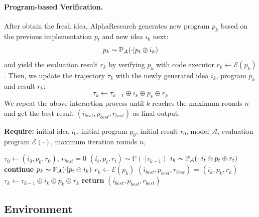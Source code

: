 \paragraph{Program-based Verification.}
After obtain the fresh idea, AlphaResearch generates new program $p_k$ based on the previous implementation $p_t$ and new idea $i_k$ next:
\begin{equation}
p_k\thicksim\mathbb{P}_{\mathcal{A}}(\cdot|p_t \oplus i_k)
\end{equation}
and yield the evaluation result $r_k$ by verifying $p_k$ with code executor $r_k\leftarrow\mathcal{E}(p_k)$. Then, we update the trajectory $\tau_k$ with the newly generated idea $i_k$, program $p_k$ and result $r_k$:
\begin{equation}
\tau_k\leftarrow\tau_{k-1}\oplus i_k\oplus p_k\oplus r_k
\end{equation}
We repeat the above interaction process until $k$ reaches the maximum rounds $n$ and get the best result $(i_{best}, p_{best}, r_{best})$ as final output.

\begin{algorithm}[t]
\small
\caption{AlphaResearch}
\label{alg:inference}
\textbf{Require:} initial idea $i_0$, initial program $p_0$, initial result $r_0$, model $\mathcal{A}$, evaluation program $\mathcal{E}(\cdot)$, maximum iteration rounds $n$, 
\begin{algorithmic}[1]
\State $\tau_0 \leftarrow (i_0, p_0, r_0)$, $r_{best}=0$ 
\State $(i_t, p_t, r_t) \sim \mathbb{P}(\cdot|\tau_{k-1})$ 
\State $i_k\thicksim\mathbb{P}_\mathcal{A}(\cdot|i_{t}\oplus p_{t}\oplus r_{t})$ 
\State \textbf{continue} 
\EndIf
\State $p_k\thicksim\mathbb{P}_{\mathcal{A}}(\cdot|p_t \oplus i_k)$ 
\State $r_k\leftarrow\mathcal{E}(p_k)$ 
\State $(i_{best}, p_{best}, r_{best})$ = $(i_{k}, p_{k}, r_{k})$
\EndIf
\State $\tau_k\leftarrow\tau_{k-1}\oplus i_k\oplus p_k\oplus r_k$ 
\EndFor
\State \textbf{return} $(i_{best}, p_{best}, r_{best})$
\end{algorithmic}
\end{algorithm}

\subsection{Environment}

